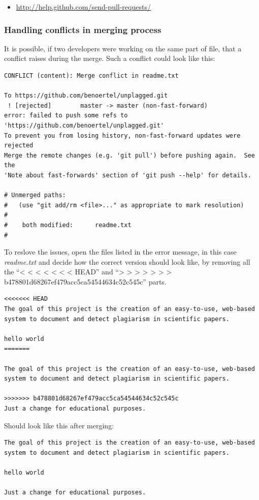 \begin{itemize}
\item \url{http://help.github.com/send-pull-requests/}
\end{itemize}

\subsubsection{Handling conflicts in merging process}
It is possible, if two developers were working on the same part of  file, that a conflict raises during the merge. Such 
a conflict could look like this:

\begin{lstlisting}[caption=Merge conflict]
CONFLICT (content): Merge conflict in readme.txt

To https://github.com/benoertel/unplagged.git
 ! [rejected]        master -> master (non-fast-forward)
error: failed to push some refs to 'https://github.com/benoertel/unplagged.git'
To prevent you from losing history, non-fast-forward updates were rejected
Merge the remote changes (e.g. 'git pull') before pushing again.  See the
'Note about fast-forwards' section of 'git push --help' for details.

# Unmerged paths:
#   (use "git add/rm <file>..." as appropriate to mark resolution)
#
#    both modified:      readme.txt
#
\end{lstlisting}

To reslove the issues, open the files listed in the error message, in this case \textit{readme.txt} and decide how the correct 
version should look like, by removing all the \enquote{< < < < < < <  HEAD} and 
\enquote{> > > > > > > b478801d68267ef479acc5ca54544634c52c545c} 
parts.

\begin{lstlisting}[caption=Creating branches]
<<<<<<< HEAD
The goal of this project is the creation of an easy-to-use, web-based
system to document and detect plagiarism in scientific papers.

hello world
=======

The goal of this project is the creation of an easy-to-use, web-based
system to document and detect plagiarism in scientific papers.

>>>>>>> b478801d68267ef479acc5ca54544634c52c545c
Just a change for educational purposes.
\end{lstlisting}

Should look like this after merging:

\begin{lstlisting}[caption=Creating branches]
The goal of this project is the creation of an easy-to-use, web-based
system to document and detect plagiarism in scientific papers.

hello world

Just a change for educational purposes.
\end{lstlisting}

